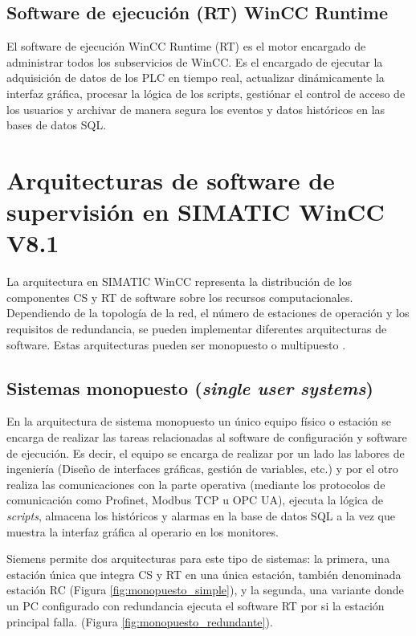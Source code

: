 \subsection{Software de ejecución (\ac{RT}) WinCC Runtime}
El software de ejecución WinCC Runtime (\ac{RT}) es el motor encargado de administrar todos los subservicios de WinCC. Es el encargado de ejecutar la adquisición de datos de los \ac{PLC} en tiempo real, actualizar dinámicamente la interfaz gráfica, procesar la lógica de los scripts, gestiónar el control de acceso de los usuarios y archivar de manera segura los eventos y datos históricos en las bases de datos SQL.\par
\section{Arquitecturas de software de supervisión en SIMATIC WinCC V8.1}
La arquitectura en SIMATIC WinCC representa la distribución de los componentes \ac{CS} y \ac{RT} de software sobre los recursos computacionales. Dependiendo de la topología de la red, el número de estaciones de operación y los requisitos de redundancia, se pueden implementar diferentes arquitecturas de software. Estas arquitecturas pueden ser monopuesto o multipuesto \cite{siemens_wincc_2024}.\par
\subsection{Sistemas monopuesto (\textit{single user systems})}
En la arquitectura de sistema monopuesto un único equipo físico o estación se encarga de realizar las tareas relacionadas al software de configuración y software de  ejecución. Es decir, el equipo se encarga de realizar por un lado las labores de ingeniería (Diseño de interfaces gráficas, gestión de variables,  etc.) y por el otro realiza las comunicaciones con la parte operativa (mediante los protocolos de comunicación como Profinet, Modbus TCP u \ac{OPC UA}),  ejecuta la lógica de \textit{scripts}, almacena los históricos y alarmas en la base de datos SQL a la vez que muestra la interfaz gráfica al operario en los monitores. \par
Siemens permite dos arquitecturas para este tipo de sistemas: la primera, una estación única que integra \ac{CS} y \ac{RT} en una única estación, también denominada estación \ac{RC} (Figura \ref{fig:monopuesto_simple}), y la segunda, una variante donde un PC configurado con redundancia ejecuta el software \ac{RT} por si la estación principal falla. (Figura \ref{fig:monopuesto_redundante}).

